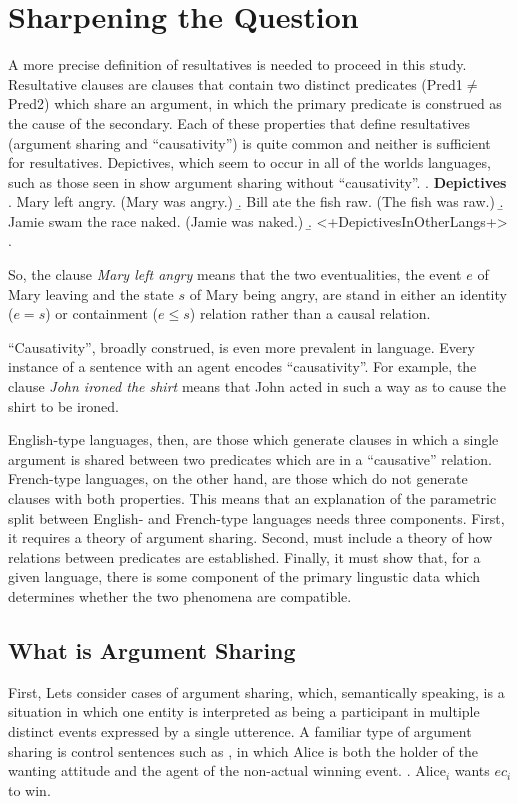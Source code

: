 \documentclass[letterpaper,12pt]{article}
\begin{document}
\section{Sharpening the Question}
A more precise definition of resultatives is needed to proceed in this study.
Resultative clauses are clauses that contain two distinct predicates (Pred1$\neq$Pred2) which share an argument, in which the primary predicate is construed as the cause of the secondary.
Each of these properties that define resultatives (argument sharing and ``causativity'') is quite common and neither is sufficient for resultatives.
Depictives, which seem to occur in all of the worlds languages, such as those seen in \Next show argument sharing without ``causativity''.
\ex. \textbf{Depictives}
\a. Mary left angry. (Mary was angry.)
\b. Bill ate the fish raw. (The fish was raw.)
\b. Jamie swam the race naked. (Jamie was naked.)
\b. <+DepictivesInOtherLangs+>
\z.

So, the clause \textit{Mary left angry} means that the two eventualities, the event $e$ of Mary leaving and the state $s$ of Mary being angry, are stand in either an identity ($e=s$) or containment ($e\leq s$) relation rather than a causal relation.

``Causativity'', broadly construed, is even more prevalent in language.
Every instance of a sentence with an agent encodes ``causativity''.
For example, the clause \textit{John ironed the shirt} means that John acted in such a way as to cause the shirt to be ironed.

English-type languages, then, are those which generate clauses in which a single argument is shared between two predicates which are in a ``causative'' relation.
French-type languages, on the other hand, are those which do not generate clauses with both properties.
This means that an explanation of the parametric split between English- and French-type languages needs three components.
First, it requires a theory of argument sharing.
Second, must include a theory of how relations between predicates are established.
Finally, it must show that, for a given language, there is some component of the primary lingustic data which determines whether the two phenomena are compatible.

\subsection{What is Argument Sharing}
First, Lets consider cases of argument sharing, which, semantically speaking, is a situation in which one entity is interpreted as being a participant in multiple distinct events expressed by a single utterence.
A familiar type of argument sharing is control sentences such as \Next, in which Alice is both the holder of the wanting attitude and the agent of the non-actual winning event.
\ex.\label{ex:Control} Alice$_i$ wants $ec_i$ to win.
\end{document}
